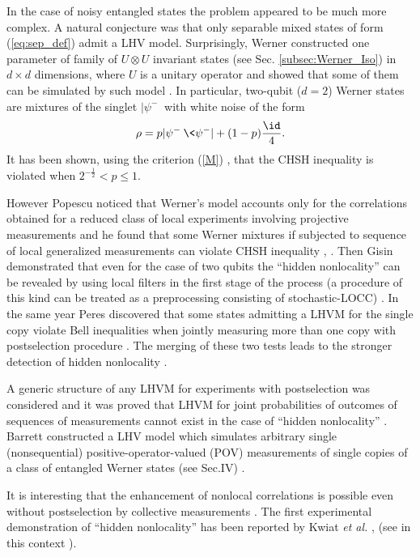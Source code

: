 \documentclass[rmp,12pt,preprint]{revtex4-2}
\begin{document}
In the case of noisy entangled states the problem appeared to be much
more complex. A natural conjecture was that only separable mixed
states of form (\ref{eq:sep_def}) admit a LHV model. Surprisingly, Werner
constructed one parameter of family of $U \otimes U$ invariant states
(see Sec. \ref{subsec:Werner_Iso}) in $d \times d$ dimensions, where
$U$ is a unitary operator and showed that some of them can be
simulated by such model \cite {Werner1989}. In particular, two-qubit
($d=2$) Werner states are mixtures of the singlet $|\psi^-\>$ with
white noise of the form
\begin{equation}
\rho = p|\psi^-\>\<\psi^-|+ (1-p)\frac{\id}{4}.
\label {W}
\end{equation}
It has been shown, using the criterion (\ref{M}) \cite {HHH1995-bell},
that the CHSH inequality is violated when ${2^{-\frac{1}{2}} } {<p\leq
  1}$.

However Popescu noticed that Werner's model accounts only for the
correlations obtained for a reduced class of local experiments
involving projective measurements and he found that some Werner
mixtures if subjected to sequence of local generalized measurements
can violate CHSH inequality , \cite {Popescu2}. Then Gisin
demonstrated that even for the case of two qubits the ``hidden
nonlocality'' can be revealed by using local filters in the first
stage of the process (a procedure of this kind can be treated as a
preprocessing consisting of stochastic-LOCC) \cite {Gisin96}. In the
same year Peres discovered that some states admitting a LHVM for the
single copy violate Bell inequalities when jointly measuring more than
one copy with postselection procedure \cite {Peres96}.  The merging of
these two tests leads to the stronger detection of hidden nonlocality
\cite {Masanes}.

A generic structure of any LHVM for experiments with postselection was
considered and it was proved that LHVM for joint probabilities of
outcomes of sequences of measurements cannot exist in the case of
``hidden nonlocality'' \cite {Popescu2,ZH,Teufel}. Barrett constructed a LHV model
which simulates arbitrary single (nonsequential) positive-operator-valued (POV) measurements of single copies of a class of entangled Werner states (see Sec.IV) \cite {Barrett2002}.


It is interesting
that the enhancement of nonlocal correlations is possible even without
postselection by collective measurements \cite {Doherty}. The first
experimental demonstration of ``hidden nonlocality'' has been reported
by Kwiat \emph{et al.} \cite {Kwiat}, (see in this context \cite {Z}).
\end{document}
